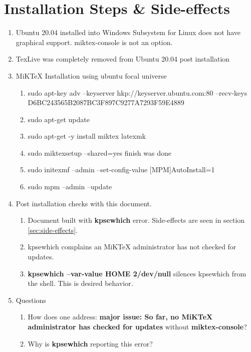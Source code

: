 \documentclass{article}%
\begin{document}
\section{Installation Steps \& Side-effects}%
\begin{enumerate}%
  \item Ubuntu 20.04 installed into Windows Subsystem for Linux does not have
    graphical support.  miktex-console is not an option.

  \item TexLive was completely removed from Ubuntu 20.04 post installation

  \item MiKTeX Installation using ubuntu focal universe

  \begin{enumerate}%
    \item sudo apt-key adv --keyserver hkp://keyserver.ubuntu.com:80 --recv-keys D6BC243565B2087BC3F897C9277A7293F59E4889

    \item sudo apt-get update 

    \item sudo apt-get -y install miktex latexmk

    \item sudo miktexsetup --shared=yes finish was done

    \item sudo initexmf --admin --set-config-value [MPM]AutoInstall=1

    \item sudo mpm --admin --update
  \end{enumerate}%


  \item Post installation checks with this document.
  \begin{enumerate} 

    \item Document built with \textbf{kpsewhich} error.  Side-effects are
      seen in section \ref{sec:side-effects}.

    \item kpsewhich complains an MiKTeX administrator has not checked for
      updates.

    \item \textbf{kpsewhich --var-value HOME 2\>/dev/null} silences kpsewhich from
      the shell.  This is desired behavior.
  \end{enumerate}%


\item Questions
  \begin{enumerate} 

    \item How does one address: \textbf{major issue: So far, no MiKTeX
      administrator has checked for updates} without \textbf{miktex-console}?

    \item Why is \textbf{kpsewhich} reporting this error?


  \end{enumerate}%


\end{enumerate}%
\end{document}
